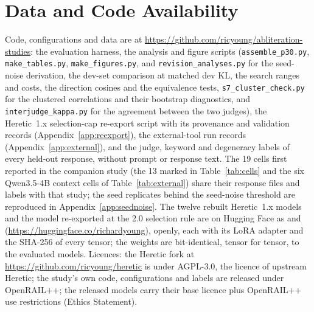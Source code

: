 \documentclass{article}
\begin{document}
\section*{Data and Code Availability}
Code, configurations and data are at \url{https://github.com/ricyoung/abliteration-studies}: the evaluation harness,
the analysis and figure scripts (\texttt{assemble\_p30.py}, \texttt{make\_tables.py}, \texttt{make\_figures.py}, and
\texttt{revision\_analyses.py} for the seed-noise derivation, the dev-set comparison at matched dev KL, the search
ranges and costs, the direction cosines and the equivalence tests, \texttt{s7\_cluster\_check.py} for the clustered
correlations and their bootstrap diagnostics, and \texttt{interjudge\_kappa.py} for the agreement between the two
judges), the Heretic~1.x
selection-cap re-export script with its provenance and validation records (Appendix~\ref{app:reexport}), the
external-tool run records (Appendix~\ref{app:external}), and the judge, keyword and degeneracy labels of every held-out
response, without prompt or response text. The 19 cells first reported in the companion study \cite{young2026harder}
(the 13 marked in Table~\ref{tab:cells} and the six Qwen3.5-4B context cells of Table~\ref{tab:external}) share their
response files and labels with that study; the seed replicates behind the seed-noise threshold are reproduced in
Appendix~\ref{app:seednoise}.
The twelve rebuilt Heretic~1.x models and the model re-exported at the 2.0 selection rule are on Hugging Face as
 and 
(\url{https://huggingface.co/richardyoung}), openly, each with its LoRA adapter and the SHA-256 of every tensor; the
weights are bit-identical, tensor for tensor, to the evaluated models. Licences: the Heretic fork at \url{https://github.com/ricyoung/heretic} is under AGPL-3.0, the licence
of upstream Heretic; the study's own code, configurations and labels are released under OpenRAIL++; the released
models carry their base licence plus OpenRAIL++ use restrictions (Ethics Statement).




\newpage
\appendix

\end{document}
